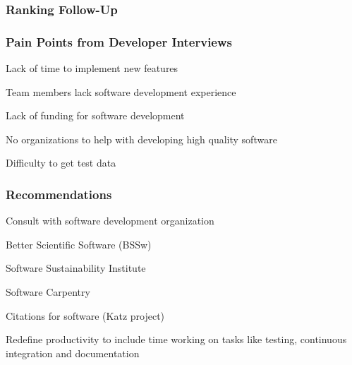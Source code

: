 \documentclass[t,12pt,numbers,fleqn]{beamer}
\begin{document}
\begin{frame}
\frametitle{Ranking Follow-Up}

\bi
\item {}
\item {}
\item {}
\ei

\end{frame}


\begin{frame}
\frametitle{Pain Points from Developer Interviews}

\bi
\item Lack of time to implement new features
\item Team members lack software development experience
\item Lack of funding for software development
\item No organizations to help with developing high quality software
\item Difficulty to get test data
  \ei

\end{frame}


\begin{frame}
\frametitle{Recommendations}

\bi
\item Consult with software development organization
  \bi
\item Better Scientific Software (BSSw)
\item Software Sustainability Institute
\item Software Carpentry
  \ei
\item Citations for software (Katz project)
  \item Redefine productivity to include time working on tasks like testing, continuous
    integration and documentation
\ei

\end{frame}

\end{document}
